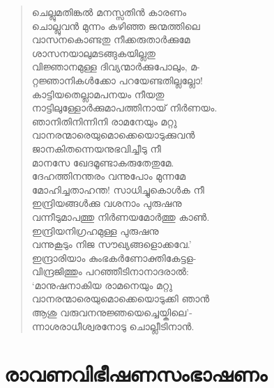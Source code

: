 \begin{verse}
ചെല്ലുമതിങ്കല്‍ മനസ്സതിന്‍ കാരണം\\
ചൊല്ലുവന്‍ മുന്നം കഴിഞ്ഞ ജന്മത്തിലെ\\
വാസനകൊണ്ടതു നീക്കരുതാര്‍ക്കുമേ\\
ശാസനയാലുമടങ്ങുകയില്ലതു\\
വിജ്ഞാനമുള്ള ദിവ്യന്മാര്‍ക്കുപോലും, മ-\\
റ്റജ്ഞാനികള്‍ക്കോ പറയേണ്ടതില്ലല്ലോ!\\
കാട്ടിയതെല്ലാമപനയം നീയതു\\
നാട്ടിലുള്ളോര്‍ക്കുമാപത്തിനായ് നിര്‍ണയം.\\
ഞാനിതിനിന്നിനി രാമനേയും മറ്റു\\
വാനരന്മാരെയുമൊക്കെയൊടുക്കുവന്‍\\
ജാനകിതന്നെയനുഭവിച്ചീടു നീ\\
മാനസേ ഖേദമൂണ്ടാകരുതേതുമേ.\\
ദേഹത്തിനന്തരം വന്നുപോം മുന്നമേ\\
മോഹിച്ചതാഹന്ത! സാധിച്ചുകൊള്‍ക നീ\\
ഇന്ദ്രിയങ്ങള്‍ക്കു വശനാം പുരുഷനു\\
വന്നീടുമാപത്തു നിര്‍ണയമോര്‍ത്തു കാണ്‍.\\
ഇന്ദ്രിയനിഗ്രഹമുള്ള പുരുഷനു\\
വന്നുകൂടും നിജ സൗഖ്യങ്ങളൊക്കവേ.’\\
ഇന്ദ്രാരിയാം കുംഭകര്‍ണോക്തികേട്ടള-\\
വിന്ദ്രജിത്തും പറഞ്ഞീടിനാനാദരാല്‍:\\
‘മാനുഷനാകിയ രാമനെയും മറ്റു\\
വാനരന്മാരെയുമൊക്കെയൊടുക്കി ഞാന്‍\\
ആശു വരുവനനുജ്ഞയെച്ചെയ്കിലെ’-\\
ന്നാശരാധീശ്വരനോടു ചൊല്ലീടിനാന്‍.
\end{verse}


\section{രാവണവിഭീഷണസംഭാഷണം}

